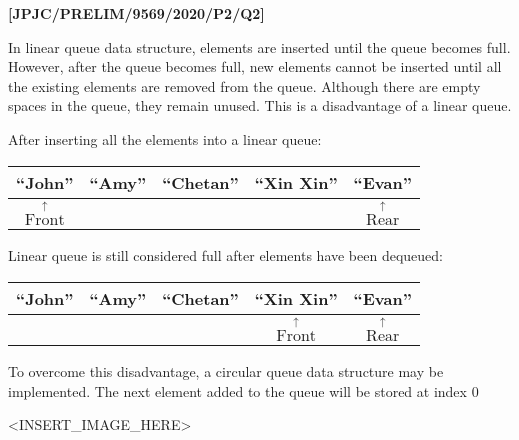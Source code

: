 \item \textbf{{[}JPJC/PRELIM/9569/2020/P2/Q2{]} }

In linear queue data structure, elements are inserted until the queue
becomes full. However, after the queue becomes full, new elements
cannot be inserted until all the existing elements are removed from
the queue. Although there are empty spaces in the queue, they remain
unused. This is a disadvantage of a linear queue. 

After inserting all the elements into a linear queue: 
\noindent \begin{center}
\begin{tabular}{|c|c|c|c|c|}
\hline 
\textquotedblleft John\textquotedblright{} & \textquotedblleft Amy\textquotedblright{}  & \textquotedblleft Chetan\textquotedblright{}  & \textquotedblleft Xin Xin\textquotedblright{}  & \textquotedblleft Evan\textquotedblright{}\tabularnewline
\hline 
\multicolumn{1}{c}{$\overset{\uparrow}{\text{Front}}$} & \multicolumn{1}{c}{} & \multicolumn{1}{c}{} & \multicolumn{1}{c}{} & \multicolumn{1}{c}{$\overset{\uparrow}{\text{Rear}}$}\tabularnewline
\end{tabular}
\par\end{center}

Linear queue is still considered full after elements have been dequeued: 
\noindent \begin{center}
\begin{tabular}{|c|c|c|c|c|}
\hline 
\textquotedblleft John\textquotedblright{} & \textquotedblleft Amy\textquotedblright{} & \textquotedblleft Chetan\textquotedblright{} & \textquotedblleft Xin Xin\textquotedblright{} & \textquotedblleft Evan\textquotedblright{}\tabularnewline
\hline 
\multicolumn{1}{c}{} & \multicolumn{1}{c}{} & \multicolumn{1}{c}{} & \multicolumn{1}{c}{$\overset{\uparrow}{\text{Front}}$} & \multicolumn{1}{c}{$\overset{\uparrow}{\text{Rear}}$}\tabularnewline
\end{tabular}
\par\end{center}

To overcome this disadvantage, a circular queue data structure may
be implemented. The next element added to the queue will be stored
at index 0 
\noindent \begin{center}
<INSERT\_IMAGE\_HERE> 
\par\end{center}

